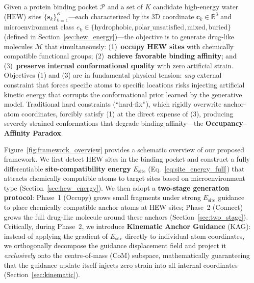 \documentclass{article}
\newcommand{\reals}{\ensuremath{\mathbb{R}}}
\begin{document}

Given a protein binding pocket $\mathcal{P}$ and a set of $K$ candidate
high-energy water (HEW) sites $\{\mathbf{s}_k\}_{k=1}^K$---each characterized
by its 3D coordinate $\mathbf{c}_k \in \reals^3$ and microenvironment class
$e_k \in \{\text{hydrophobic}, \text{polar\_unsatisfied}, \text{mixed},
\text{buried}\}$ (defined in Section~\ref{sec:hew_energy})---the objective is
to generate drug-like molecules $\mathcal{M}$ that simultaneously:
(1)~\textbf{occupy HEW sites} with chemically compatible functional groups;
(2)~\textbf{achieve favorable binding affinity}; and
(3)~\textbf{preserve internal conformational quality} with zero artificial
strain.  Objectives (1) and (3) are in fundamental physical tension: \emph{any}
external constraint that forces specific atoms to specific locations risks
injecting artificial kinetic energy that corrupts the conformational prior
learned by the generative model.  Traditional hard constraints (``hard-fix''),
which rigidly overwrite anchor-atom coordinates, forcibly satisfy (1) at the
direct expense of (3), producing severely strained conformations that degrade
binding affinity---the \textbf{Occupancy--Affinity Paradox}.

Figure~\ref{fig:framework_overview} provides a schematic overview of our
proposed framework.  We first detect HEW sites in the binding pocket and
construct a fully differentiable \textbf{site-compatibility energy}
$E_{\text{site}}$ (Eq.~\ref{eq:site_energy_full}) that attracts chemically
compatible atoms to target sites based on microenvironment type
(Section~\ref{sec:hew_energy}).  We then adopt a \textbf{two-stage generation
protocol}: Phase~1 (Occupy) grows small fragments under strong $E_{\text{site}}$
guidance to place chemically compatible anchor atoms at HEW sites; Phase~2
(Connect) grows the full drug-like molecule around these anchors
(Section~\ref{sec:two_stage}).  Critically, during Phase~2, we introduce
\textbf{Kinematic Anchor Guidance} (KAG): instead of applying the gradient of
$E_{\text{site}}$ directly to individual atom coordinates, we orthogonally
decompose the guidance displacement field and project it \emph{exclusively}
onto the centre-of-mass (CoM) subspace, mathematically guaranteeing that the
guidance update itself injects zero strain into all internal coordinates
(Section~\ref{sec:kinematic}).
\end{document}
